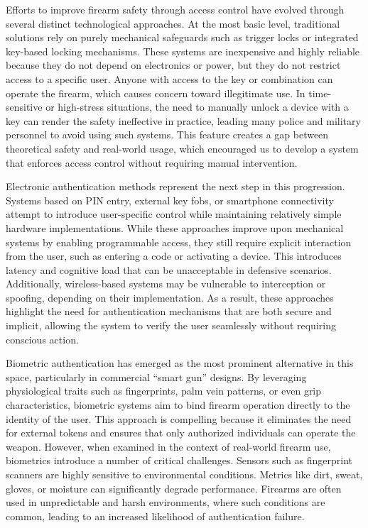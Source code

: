 Efforts to improve firearm safety through access control have evolved through several distinct technological approaches. 
At the most basic level, traditional solutions rely on purely mechanical safeguards such as trigger locks or integrated 
key-based locking mechanisms. These systems are inexpensive and highly reliable because they do not depend on electronics 
or power, but they do not restrict access to a specific user. Anyone with access to the key or combination can operate 
the firearm, which causes concern toward illegitimate use. In time-sensitive or high-stress situations, the need to manually 
unlock a device with a key can render the safety ineffective in practice, leading many police and military personnel to avoid
using such systems. This feature creates a gap between theoretical safety and real-world usage, which encouraged us to develop 
a system that enforces access control without requiring manual intervention.

Electronic authentication methods represent the next step in this progression. Systems based on PIN entry, external key fobs,
or smartphone connectivity attempt to introduce user-specific control while maintaining relatively simple hardware implementations.
While these approaches improve upon mechanical systems by enabling programmable access, they still require explicit interaction
from the user, such as entering a code or activating a device. This introduces latency and cognitive load that can be unacceptable
in defensive scenarios. Additionally, wireless-based systems may be vulnerable to interception or spoofing, depending on 
their implementation. As a result, these approaches highlight the need for authentication mechanisms that are both secure 
and implicit, allowing the system to verify the user seamlessly without requiring conscious action.

Biometric authentication has emerged as the most prominent alternative in this space, particularly in commercial “smart gun” 
designs. By leveraging physiological traits such as fingerprints, palm vein patterns, or even grip characteristics, biometric 
systems aim to bind firearm operation directly to the identity of the user. This approach is compelling because it eliminates 
the need for external tokens and ensures that only authorized individuals can operate the weapon. However, when 
examined in the context of real-world firearm use, biometrics introduce a number of critical challenges. Sensors such as 
fingerprint scanners are highly sensitive to environmental conditions. Metrics like dirt, sweat, gloves, or moisture can significantly 
degrade performance. Firearms are often used in unpredictable and harsh environments, where such conditions are common, leading
to an increased likelihood of authentication failure.

